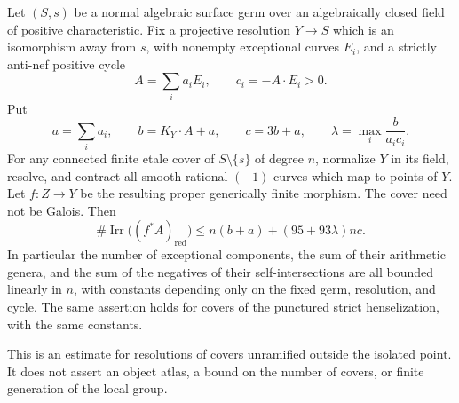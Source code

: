 \begin{proposition}
\label{D:punctured-cover-linear-resolution}
Let $(S,s)$ be a normal algebraic surface germ over an algebraically
closed field of positive characteristic.  Fix a projective resolution
$Y\to S$ which is an isomorphism away from $s$, with nonempty exceptional
curves $E_i$, and a strictly anti-nef positive cycle
\[
 A=\sum_i a_iE_i,\qquad c_i=-A\cdot E_i>0.
\]
Put
\[
 a=\sum_i a_i,\qquad b=K_Y\cdot A+a,\qquad c=3b+a,
 \qquad \lambda=\max_i\frac{b}{a_ic_i}.
 \tag{D.LR.1}
\]
For any connected finite etale cover of $S\setminus\{s\}$ of
degree $n$, normalize $Y$ in its field, resolve, and contract all
smooth rational $(-1)$-curves which map to points of $Y$.
Let $f:Z\to Y$ be the resulting proper generically finite morphism.
The cover need not be Galois.  Then
\[
 \#\operatorname{Irr}\bigl((f^*A)_{\mathrm{red}}\bigr)
 \le n(b+a)+(95+93\lambda)nc.
 \tag{D.LR.2}
\]
In particular the number of exceptional components, the sum of their
arithmetic genera, and the sum of the negatives of their
self-intersections are all bounded linearly in $n$, with constants
depending only on the fixed germ, resolution, and cycle.
The same assertion holds for covers of the punctured strict
henselization, with the same constants.

This is an estimate for resolutions of covers unramified outside
the isolated point.  It does not assert an object atlas, a bound on
the number of covers, or finite generation of the local group.
\end{proposition}

